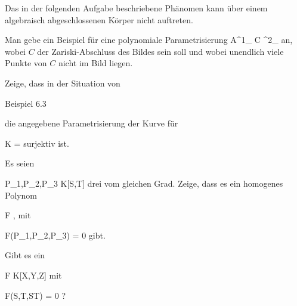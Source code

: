 Das in der folgenden Aufgabe beschriebene Phänomen kann über einem algebraisch abgeschlossenen Körper nicht auftreten.

{}
{





Man gebe ein Beispiel für eine polynomiale Parametrisierung
\maabbdisp {\varphi} { {\mathbb A}^{1}_{\R} } { C  ^{2}_{\R}
} {}
an, wobei $C$ der Zariski-Abschluss des Bildes sein soll und wobei unendlich viele Punkte von $C$ nicht im Bild liegen.





}
{} {}

{}
{





Zeige, dass in der Situation von

Beispiel 6.3

die angegebene Parametrisierung der Kurve für

\mavergleichskette
{\vergleichskette
{ K
}
{ = }{ \R
}
{  }{
}
{    }{
}
{   }{
}
}
{}{}{}
surjektiv ist.





}
{} {}

{}
{





Es seien

\mavergleichskette
{\vergleichskette
{ P_1,P_2,P_3
}
{ \in }{ K[S,T]
}
{  }{
}
{    }{
}
{   }{
}
}
{}{}{}
drei
vom gleichen Grad. Zeige, dass es ein homogenes Polynom

 {}
 {F } {}
 {} {} {} {,}
mit

\mavergleichskettedisp
{\vergleichskette
{ F(P_1,P_2,P_3)
}
{ =} { 0
}
{ } {
}
{ } {
}
{ } {
}
}
{}{}{}
gibt.





}
{} {}

{}
{





Gibt es ein

\mavergleichskette
{\vergleichskette
{ F
}
{ \in }{ K[X,Y,Z]
}
{  }{
}
{    }{
}
{   }{
}
}
{}{}{}
 {} {}
mit

\mavergleichskette
{\vergleichskette
{ F(S,T,ST)
}
{ = }{ 0
}
{  }{
}
{    }{
}
{   }{
}
}
{}{}{?}





}
{} {}

